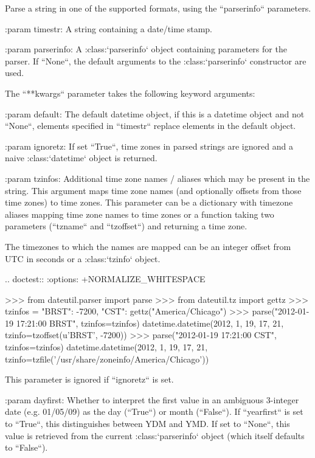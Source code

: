\begin{DoxyVerb}Parse a string in one of the supported formats, using the
``parserinfo`` parameters.

:param timestr:
    A string containing a date/time stamp.

:param parserinfo:
    A :class:`parserinfo` object containing parameters for the parser.
    If ``None``, the default arguments to the :class:`parserinfo`
    constructor are used.

The ``**kwargs`` parameter takes the following keyword arguments:

:param default:
    The default datetime object, if this is a datetime object and not
    ``None``, elements specified in ``timestr`` replace elements in the
    default object.

:param ignoretz:
    If set ``True``, time zones in parsed strings are ignored and a naive
    :class:`datetime` object is returned.

:param tzinfos:
    Additional time zone names / aliases which may be present in the
    string. This argument maps time zone names (and optionally offsets
    from those time zones) to time zones. This parameter can be a
    dictionary with timezone aliases mapping time zone names to time
    zones or a function taking two parameters (``tzname`` and
    ``tzoffset``) and returning a time zone.

    The timezones to which the names are mapped can be an integer
    offset from UTC in seconds or a :class:`tzinfo` object.

    .. doctest::
       :options: +NORMALIZE_WHITESPACE

        >>> from dateutil.parser import parse
        >>> from dateutil.tz import gettz
        >>> tzinfos = {"BRST": -7200, "CST": gettz("America/Chicago")}
        >>> parse("2012-01-19 17:21:00 BRST", tzinfos=tzinfos)
        datetime.datetime(2012, 1, 19, 17, 21, tzinfo=tzoffset(u'BRST', -7200))
        >>> parse("2012-01-19 17:21:00 CST", tzinfos=tzinfos)
        datetime.datetime(2012, 1, 19, 17, 21,
                          tzinfo=tzfile('/usr/share/zoneinfo/America/Chicago'))

    This parameter is ignored if ``ignoretz`` is set.

:param dayfirst:
    Whether to interpret the first value in an ambiguous 3-integer date
    (e.g. 01/05/09) as the day (``True``) or month (``False``). If
    ``yearfirst`` is set to ``True``, this distinguishes between YDM and
    YMD. If set to ``None``, this value is retrieved from the current
    :class:`parserinfo` object (which itself defaults to ``False``).


\end{DoxyVerb}
